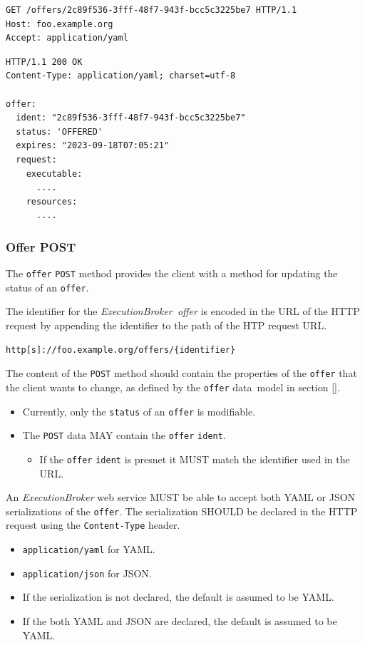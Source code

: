 \documentclass[11pt,a4paper]{ivoa}
\newcommand{\json} {JSON}
\newcommand{\yaml} {YAML}
\newcommand{\datamodel} {data~model}
\newcommand{\webservice} {web service}
\newcommand{\execbrokerclass} {\textit{ExecutionBroker}}
\newcommand{\execoffer}[1] {\textit{ExecutionBroker~offer#1}}
\newcommand{\codeword}[1] {\texttt{#1}}
\begin{document}
\begin{lstlisting}[]
GET /offers/2c89f536-3fff-48f7-943f-bcc5c3225be7 HTTP/1.1
Host: foo.example.org
Accept: application/yaml
\end{lstlisting}

\begin{lstlisting}[]
HTTP/1.1 200 OK
Content-Type: application/yaml; charset=utf-8

offer:
  ident: "2c89f536-3fff-48f7-943f-bcc5c3225be7"
  status: 'OFFERED'
  expires: "2023-09-18T07:05:21"
  request:
    executable:
      ....
    resources:
      ....
\end{lstlisting}

\subsubsection{Offer POST}
\label{execution-planner-offer-post}

The \codeword{offer} \codeword{POST} method provides the client with a method for
updating the status of an \codeword{offer}.

The identifier for the \execoffer{} is encoded in the URL of the HTTP request by appending the
identifier to the path of the HTP request URL.

\begin{lstlisting}[]
http[s]://foo.example.org/offers/{identifier}
\end{lstlisting}

The content of the \codeword{POST} method should contain the properties
of the \codeword{offer} that the client wants to change, as defined by
the \codeword{offer} \datamodel{} in section \ref{}.
\begin{itemize}
    \item Currently, only the \codeword{status} of an \codeword{offer} is modifiable.
    \item The \codeword{POST} data MAY contain the \codeword{offer} \codeword{ident}.
    \begin{itemize}
        \item If the \codeword{offer} \codeword{ident} is presnet it MUST match the identifier used in the URL.
    \end{itemize}
\end{itemize}

An \execbrokerclass{} \webservice{} MUST be able to accept both \yaml{} or \json{} serializations
of the \codeword{offer}.
The serialization SHOULD be declared in the HTTP request using the \codeword{Content-Type} header.
\begin{itemize}
    \item \codeword{application/yaml} for \yaml{}.
    \item \codeword{application/json} for \json{}.
    \item If the serialization is not declared, the default is assumed to be \yaml{}.
    \item If the both \yaml{} and \json{} are declared, the default is assumed to be \yaml{}.
\end{itemize}
\end{document}
